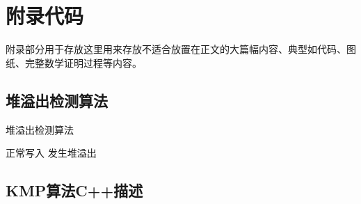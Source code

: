 \chapter{附录代码}

附录部分用于存放这里用来存放不适合放置在正文的大篇幅内容、典型如代码、图纸、完整数学证明过程等内容。

\section{堆溢出检测算法}

\begin{algorithm}[h]
    \caption{堆溢出检测算法}\label{alg:ovf}
    \begin{algorithmic}[1]
            \STATE 正常写入
            \STATE 发生堆溢出
        \ENDIF
    \end{algorithmic}
\end{algorithm}

\section{KMP算法C++描述}

